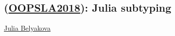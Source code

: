 \subsection{(\href{https://dl.acm.org/citation.cfm?doid=3288538.3276483}{OOPSLA2018}): Julia subtyping}
\label{paper:oopsla2018JuliaSubtyping}

\href{https://julbinb.github.io/}{Julia Belyakova}